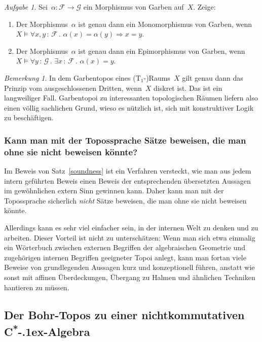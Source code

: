 \documentclass[a4paper,ngerman,12pt]{scrartcl}
\theoremstyle{definition}
\theoremstyle{plain}
\theoremstyle{remark}
\newtheorem{bem}[defn]{Bemerkung}
\newtheorem{aufg}[defn]{Aufgabe}
\newcommand{\F}{\mathcal{F}}
\newcommand{\G}{\mathcal{G}}
\newcommand{\csalgebra}{C\textsuperscript{*}\kern-.1ex-Algebra}
\renewcommand{\_}{\mathpunct{.}\,}
\newcommand{\?}{\,{:}\,}
\begin{document}
\begin{aufg}Sei~$\alpha : \F \to \G$ ein Morphismus von Garben auf~$X$. Zeige:
\begin{enumerate}
\item
Der Morphismus~$\alpha$ ist genau dann ein Monomorphismus von Garben, wenn
$X \models \forall x,y\?\F\_ \alpha(x) = \alpha(y) \Rightarrow x = y$.
\item
Der Morphismus~$\alpha$ ist genau dann ein Epimorphismus von Garben, wenn
$X \models \forall y\?\G\_ \exists x\?\F\_ \alpha(x) = y$.
\end{enumerate}
\end{aufg}

\begin{bem}In dem Garbentopos eines ($\text{T}_1$-)Raums~$X$ gilt genau dann das Prinzip
vom ausgeschlossenen Dritten, wenn~$X$ diskret ist. Das ist ein langweiliger
Fall. Garbentopoi zu interessanten topologischen Räumen liefern also einen
völlig sachlichen Grund, wieso es nützlich ist, sich mit konstruktiver Logik zu
beschäftigen.
\end{bem}

\subsubsection*{Kann man mit der Topossprache Sätze beweisen, die man ohne sie
nicht beweisen könnte?}

Im Beweis von Satz~\ref{soundness} ist ein Verfahren versteckt, wie man aus
jedem intern geführten Beweis einen Beweis der entsprechenden übersetzten
Aussagen im gewöhnlichen extern Sinn gewinnen kann. Daher kann man mit der
Topossprache sicherlich \emph{nicht} Sätze beweisen, die man ohne sie nicht
beweisen könnte.

Allerdings kann es sehr viel einfacher sein, in der internen Welt zu denken und
zu arbeiten. Dieser Vorteil ist nicht zu unterschätzen: Wenn man sich etwa
einmalig ein Wörterbuch zwischen externen Begriffen der algebraischen Geometrie
und zugehörigen internen Begriffen geeigneter Topoi anlegt, kann man fortan
viele Beweise von grundlegenden Aussagen kurz und konzeptionell
führen, anstatt wie sonst mit affinen Überdeckungen, Übergang zu Halmen
und ähnlichen Techniken hantieren zu müssen.


\subsection{Der Bohr-Topos zu einer nichtkommutativen \csalgebra}
\end{document}
